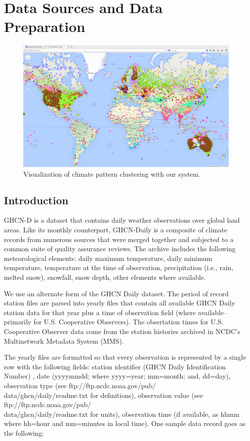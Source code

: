 \section{Data Sources and Data Preparation}

\begin{figure}
\centering
\includegraphics[width=.85\linewidth]{./figure/Full_view.png}
	\caption{Visualization of climate pattern clustering with our system.}
	\label{fig:FullView}
\end{figure}

\subsection{Introduction}
GHCN-D is a dataset that contains daily weather observations over global land areas.
Like its monthly counterpart, GHCN-Daily is a composite of climate records from
numerous sources that were merged together and subjected to a common suite of quality
assurance reviews. The archive includes the following meteorological elements: daily maximum temperature, daily minimum temperature, temperature at the time of observation, precipitation (i.e., rain, melted snow), snowfall, snow depth, other elements where available.

We use an alternate form of the GHCN Daily dataset. The period of record station files are parsed into
yearly files that contain all available GHCN Daily station data for that year
plus a time of observation field (where available--primarily for U.S. Cooperative
Observers).  The obsertation times for U.S. Cooperative Observer data
come from the station histories archived in NCDC's Multinetwork Metadata System (MMS).

The yearly files are formatted so that every observation
 is represented by a single row
with the following fields:
station identifier (GHCN Daily Identification Number)
, date (yyyymmdd; where yyyy=year; mm=month; and, dd=day), observation type (see ftp://ftp.ncdc.noaa.gov/pub/\\data/ghcn/daily/readme.txt for definitions), observation value (see ftp://ftp.ncdc.noaa.gov/pub/\\data/ghcn/daily/readme.txt for units), observation time (if available, as hhmm where hh=hour and mm=minutes in local time). One sample data record goes as the following: 

